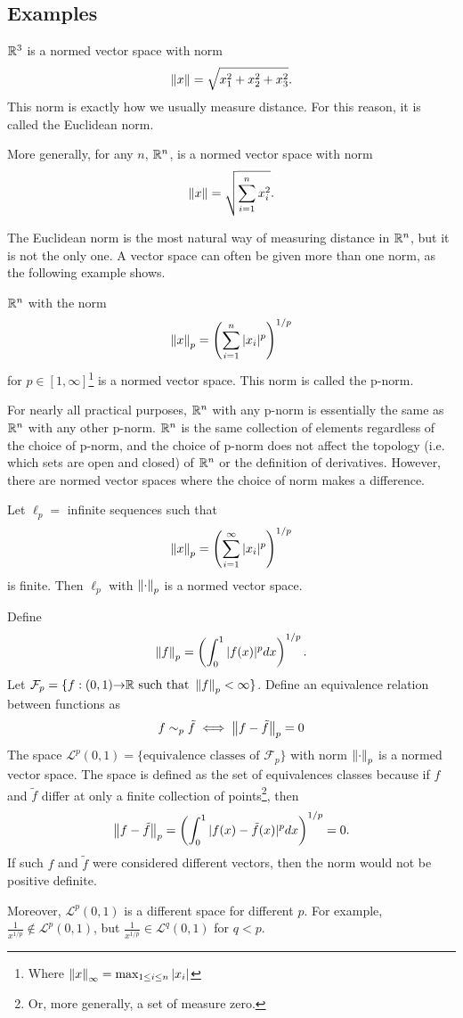 \subsection{Examples}
\begin{example}
  $\mathbb{R}^3$ is a normed vector space with norm
  \[ \left\Vert {x} \right\Vert = \sqrt{x_1^2 + x_2^2 + x_3^2}. \] 
  This norm is exactly
  how we usually measure distance. For this reason, it is called the
  Euclidean norm.

  More generally, for any $n$, $\mathbb{R}^n$, is a normed vector space with
  norm 
  \[ \left\Vert {x} \right\Vert = \sqrt{\sum_{i=1}^n x_i^2 }. \]
\end{example}
The Euclidean norm is the most natural way of measuring distance in
$\mathbb{R}^n$, but it is not the only one.  A vector space can often be given
more than one norm, as the following example shows.
\begin{example}
  $\mathbb{R}^n$ with the norm 
  \[ \left\Vert {x} \right\Vert_p = \left( \sum_{i=1}^n |x_i|^p \right)^{1/p} \]
  for $p \in [1,\infty]$\footnote{Where $\left\Vert {x} \right\Vert_\infty = \max_{1\leq
      i \leq n} |x_i| $} is a normed vector space. This norm is called
  the p-norm. 
\end{example}
For nearly all practical purposes, $\mathbb{R}^n$ with any p-norm is
essentially the same as $\mathbb{R}^n$ with any other p-norm. $\mathbb{R}^n$ is the
same collection of elements regardless of the choice of p-norm, and
the choice of p-norm does not affect the topology (i.e. which sets are
open and closed) of $\mathbb{R}^n$ or the definition of derivatives. However,
there are normed vector spaces where the choice of norm makes a
difference.
\begin{example}
  Let $\ell_p =$ infinite sequences such that 
  \[ \left\Vert {x} \right\Vert_p = \left( \sum_{i=1}^\infty |x_i|^p \right)^{1/p} \]
  is finite. Then $\ell_p$ with $\left\Vert {\cdot} \right\Vert_p$ is a normed vector
  space. 
\end{example}
\begin{example}
  Define 
  \[ \left\Vert {f} \right\Vert_p = \left(\int_0^1 |f(x)|^p dx\right)^{1/p}. \]
  Let $\mathcal{F}_p = \{f: (0,1) {\rightarrow} \mathbb{R} \text{ such that }
  \left\Vert {f} \right\Vert_p<\infty\}$. 
  Define an equivalence relation between functions as
  \[ f \sim_p \tilde{f} \iff \left\Vert {f - \tilde{f}} \right\Vert_p = 0 \] The space
  $\mathcal{L}^p(0,1) = \{\text{equivalence classes of
  }\mathcal{F}_p\}$ with norm $\left\Vert {\cdot} \right\Vert_p$ is a normed vector
  space. The space is defined as the set of equivalences classes
  because if $f$ and $\tilde{f}$ differ at only a finite collection of
  points\footnote{Or, more generally, a set of measure zero.}, then
  \[ \left\Vert {f-\tilde{f}} \right\Vert_p = \left(\int_0^1 |f(x) - \tilde{f}(x) |^p
      dx\right)^{1/p} = 0. \] If such $f$ and $\tilde{f}$ were
  considered different vectors, then the norm would not be positive
  definite.
  
  Moreover, $\mathcal{L}^p(0,1)$ is a different
  space for different $p$. For example, $\frac{1}{x^{1/p}} \not\in
  \mathcal{L}^p(0,1)$, but $\frac{1}{x^{1/p}} \in \mathcal{L}^q(0,1)$
  for $q < p$. 
\end{example}
